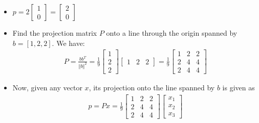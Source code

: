 \begin{frame}{}
\begin{itemize}
    \item $p= 2\begin{bmatrix}
        1\\0
    \end{bmatrix}= \begin{bmatrix}
        2\\0
    \end{bmatrix}$
    \item Find the projection matrix $P$ onto a line through the origin spanned by $b=[1, 2, 2]$. We have:
    \begin{align}
        P = \frac{bb^T}{\Vert b \Vert ^2} = \frac{1}{9} \begin{bmatrix}
            1\\ 2\\ 2 
        \end{bmatrix}\begin{bmatrix}
            1 & 2& 2 
        \end{bmatrix} = \frac{1}{9} \begin{bmatrix}
            1 & 2&2\\
            2&4 & 4\\
            2&4&4
        \end{bmatrix}
    \end{align}
    \item Now, given any vector $x$, its projection onto the line spanned by $b$ is given as 
    \begin{align}
        p = Px = \frac{1}{9} \begin{bmatrix}
            1 & 2&2\\
            2&4 & 4\\
            2&4&4
        \end{bmatrix}\begin{bmatrix}
            x_1\\x_2 \\
            x_3
        \end{bmatrix}
    \end{align}
\end{itemize}
\end{frame}
